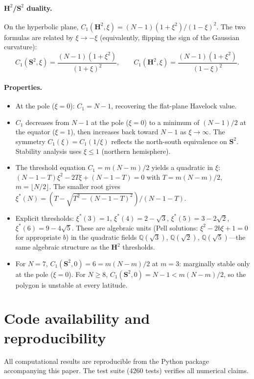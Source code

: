 \paragraph{$\mathbf{H}^2$/$\mathbf{S}^2$ duality.}
On the hyperbolic plane,
$C_1(\mathbf{H}^2, \xi) = (N{-}1)(1+\xi^2)/(1-\xi)^2$.
The two formulas are related by $\xi \to -\xi$ (equivalently,
flipping the sign of the Gaussian curvature):
\[
  C_1(\mathbf{S}^2, \xi) = \frac{(N-1)(1+\xi^2)}{(1+\xi)^2},
  \qquad
  C_1(\mathbf{H}^2, \xi) = \frac{(N-1)(1+\xi^2)}{(1-\xi)^2}.
\]

\paragraph{Properties.}
\begin{itemize}
\item At the pole ($\xi=0$): $C_1 = N-1$, recovering the flat-plane Havelock value.
\item $C_1$ decreases from $N-1$ at the pole ($\xi = 0$) to a
  minimum of $(N-1)/2$ at the equator ($\xi = 1$), then increases
  back toward $N-1$ as $\xi \to \infty$.  The symmetry
  $C_1(\xi) = C_1(1/\xi)$ reflects the north-south equivalence
  on $\mathbf{S}^2$.  Stability analysis uses $\xi \le 1$
  (northern hemisphere).
\item The threshold equation $C_1 = m(N{-}m)/2$ yields a quadratic
  in $\xi$: $(N{-}1{-}T)\xi^2 - 2T\xi + (N{-}1{-}T) = 0$ with
  $T = m(N{-}m)/2$, $m = \lfloor N/2\rfloor$.  The smaller root
  gives $\xi^*(N) = (T - \sqrt{T^2 - (N{-}1{-}T)^2})/(N{-}1{-}T)$.
\item Explicit thresholds:
  $\xi^*(3) = 1$,\;
  $\xi^*(4) = 2 - \sqrt{3}$,\;
  $\xi^*(5) = 3 - 2\sqrt{2}$,\;
  $\xi^*(6) = 9 - 4\sqrt{5}$.
  These are algebraic units (Pell solutions: $\xi^2 - 2b\xi + 1 = 0$
  for appropriate $b$) in the quadratic fields
  $\mathbb{Q}(\sqrt{3})$, $\mathbb{Q}(\sqrt{2})$,
  $\mathbb{Q}(\sqrt{5})$---the same algebraic structure as the
  $\mathbf{H}^2$ thresholds.
\item For $N = 7$, $C_1(\mathbf{S}^2,0) = 6 = m(N{-}m)/2$ at $m = 3$:
  marginally stable only at the pole ($\xi = 0$).
  For $N \ge 8$, $C_1(\mathbf{S}^2,0) = N-1 < m(N{-}m)/2$,
  so the polygon is unstable at every latitude.
\end{itemize}


\section{Code availability and reproducibility}
\label{app:code}
All computational results are reproducible from the Python
package  accompanying this paper.
The test suite (4260 tests) verifies all numerical claims.


